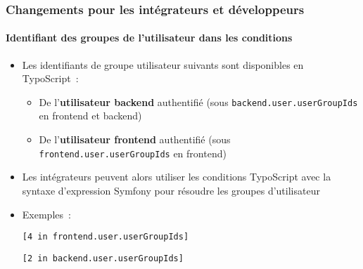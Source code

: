 %

\begin{frame}[fragile]
	\frametitle{Changements pour les intégrateurs et développeurs}
	\framesubtitle{Identifiant des groupes de l'utilisateur dans les conditions}


	\begin{itemize}
		\item Les identifiants de groupe utilisateur suivants sont disponibles en TypoScript~:

		\begin{itemize}
			\item De l'\textbf{utilisateur backend} authentifié\newline
				(sous \texttt{backend.user.userGroupIds} en frontend et backend)
			\item De l'\textbf{utilisateur frontend} authentifié\newline
				(sous \texttt{frontend.user.userGroupIds} en frontend)
		\end{itemize}

		\item Les intégrateurs peuvent alors utiliser les conditions TypoScript avec la syntaxe
		    d'expression Symfony pour résoudre les groupes d'utilisateur
		\item Exemples~:
\begin{lstlisting}
[4 in frontend.user.userGroupIds]
\end{lstlisting}
\vspace{-0.2cm}
\begin{lstlisting}
[2 in backend.user.userGroupIds]
\end{lstlisting}
	\end{itemize}

\end{frame}

